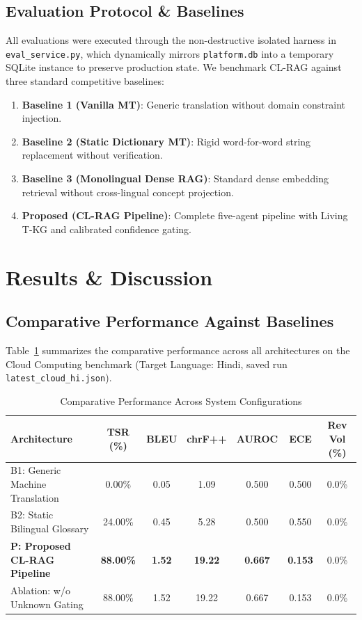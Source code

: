\documentclass[conference]{IEEEtran}
\begin{document}
\subsection{Evaluation Protocol \& Baselines}
All evaluations were executed through the non-destructive isolated harness in \texttt{eval\_service.py}, which dynamically mirrors \texttt{platform.db} into a temporary SQLite instance to preserve production state. We benchmark CL-RAG against three standard competitive baselines:
\begin{enumerate}
    \item \textbf{Baseline 1 (Vanilla MT)}: Generic translation without domain constraint injection.
    \item \textbf{Baseline 2 (Static Dictionary MT)}: Rigid word-for-word string replacement without verification.
    \item \textbf{Baseline 3 (Monolingual Dense RAG)}: Standard dense embedding retrieval without cross-lingual concept projection.
    \item \textbf{Proposed (CL-RAG Pipeline)}: Complete five-agent pipeline with Living T-KG and calibrated confidence gating.
\end{enumerate}

\section{Results \& Discussion}
 
\subsection{Comparative Performance Against Baselines}
Table~\ref{tab:baselines} summarizes the comparative performance across all architectures on the Cloud Computing benchmark (Target Language: Hindi, saved run \texttt{latest\_cloud\_hi.json}).
 
\begin{table}[htbp]
\caption{Comparative Performance Across System Configurations}
\begin{center}
\begin{tabular}{lcccccc}
\toprule
\textbf{Architecture} & \textbf{TSR (\%)} & \textbf{BLEU} & \textbf{chrF++} & \textbf{AUROC} & \textbf{ECE} & \textbf{Rev Vol (\%)} \\
\midrule
B1: Generic Machine Translation & 0.00\% & 0.05 & 1.09 & 0.500 & 0.500 & 0.0\% \\
B2: Static Bilingual Glossary & 24.00\% & 0.45 & 5.28 & 0.500 & 0.550 & 0.0\% \\
\textbf{P: Proposed CL-RAG Pipeline} & \textbf{88.00\%} & \textbf{1.52} & \textbf{19.22} & \textbf{0.667} & \textbf{0.153} & 0.0\% \\
Ablation: w/o Unknown Gating & 88.00\% & 1.52 & 19.22 & 0.667 & 0.153 & 0.0\% \\
\bottomrule
\end{tabular}
\label{tab:baselines}
\end{center}
\end{table}
\end{document}
